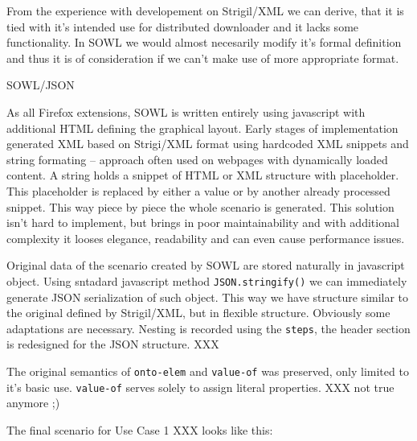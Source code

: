 From the experience with developement on Strigil/XML we can derive, that it is
tied with it's intended use for distributed downloader and it lacks some
functionality. In SOWL we would almost necesarily modify it's formal definition
and thus it is of consideration if we can't make use of more appropriate
format. 


\secc SOWL/JSON

As all Firefox extensions, SOWL is written entirely using javascript with
additional HTML defining the graphical layout. Early stages of implementation
generated XML based on Strigi/XML format using hardcoded XML snippets and
string formating -- approach often used on webpages with dynamically loaded
content. A string holds a snippet of HTML or XML structure with placeholder.
This placeholder is replaced by either a value or by another already processed
snippet. This way piece by piece the whole scenario is generated. This solution
isn't hard to implement, but brings in poor maintainability and with additional
complexity it looses elegance, readability and can even cause performance
issues. 

Original data of the scenario created by SOWL are stored naturally in
javascript object. Using sntadard javascript method {\tt JSON.stringify()} we
can immediately generate JSON serialization of such object. This way we have
structure similar to the original defined by Strigil/XML, but in flexible
structure. Obviously some adaptations are necessary. Nesting is recorded using
the {\tt steps}, the header section is redesigned for the JSON structure. XXX

The original semantics of {\tt onto-elem} and {\tt value-of} was preserved,
only limited to it's basic use. {\tt value-of} serves solely to assign literal
properties. XXX not true anymore ;) 

The final scenario for Use Case 1 XXX looks like this: 

